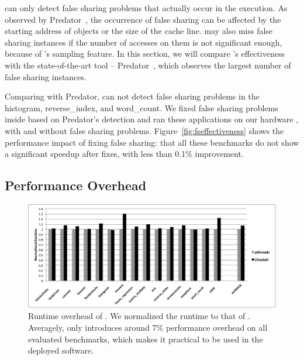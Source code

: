 \cheetah{} can only detect false sharing problems that actually occur in the execution. As observed by Predator~\cite{Predator}, the occurrence of false sharing can be affected by the starting address of objects or the size of the cache line. \cheetah{} may also miss false sharing instances if the number of accesses on them is not significant enough, because of \cheetah{}'s sampling feature. In this section, we will compare \cheetah{}'s effectiveness with the state-of-the-art tool -- Predator~\cite{Predator}, which observes the largest number of false sharing instances. 

Comparing with Predator, \cheetah{} can not detect false sharing problems in the histogram, reverse\_index, and word\_count. We fixed false sharing problems inside based on Predator's detection and ran these applications on our hardware , with and without false sharing problems. Figure~\ref{fig:fseffectiveness} shows the performance impact of fixing false sharing: that all these benchmarks do not show a significant speedup after fixes, with less than 0.1\% improvement.  

\subsection{Performance Overhead}
\label{sec:perf}

\begin{figure}[htbp]
\centering
\label{fig:overhead}
\includegraphics[width=2\columnwidth]{figure/Overhead.pdf}
\caption{Runtime overhead of \Cheetah{}. We normalized the runtime to that of \pthreads{}. Averagely, \cheetah{} only introduces around 7\% performance overhead on all evaluated benchmarks, which makes it practical to be used in the deployed software. }
\end{figure}


